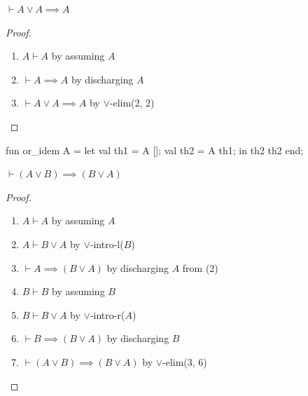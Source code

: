 \begin{node}
$\vdash A\lor A\implies A$
\end{node}

\begin{proof}
\begin{enumerate}
\item $A\vdash A$ by assuming $A$
\item $\vdash A\implies A$ by discharging $A$
\item $\vdash A\lor A\implies A$ by $\lor$-elim(2, 2)\qedhere
\end{enumerate}
\end{proof}

\nwenddocs{}\endmoddef\nwstartdeflinemarkup{}\nwenddeflinemarkup
fun or_idem A =
  let
    val th1 =  A [];
    val th2 =  A th1;
  in
     th2 th2
  end;
\nwendcode{}\nwdocspar

\begin{node}
$\vdash (A\lor B)\implies(B\lor A)$
\end{node}

\begin{proof}
\begin{enumerate}
\item $A\vdash A$ by assuming $A$
\item $A\vdash B\lor A$ by $\lor$-intro-l($B$)
\item $\vdash A\implies(B\lor A)$ by discharging $A$ from (2)
\item $B\vdash B$ by assuming $B$
\item $B\vdash B\lor A$ by $\lor$-intro-r($A$)
\item $\vdash B\implies(B\lor A)$ by discharging $B$
\item $\vdash(A\lor B)\implies(B\lor A)$ by $\lor$-elim(3, 6)\qedhere
\end{enumerate}
\end{proof}

